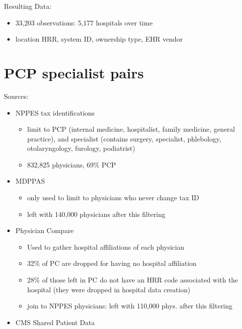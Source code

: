 \documentclass[12pt]{article}
\begin{document}
\noindent Resulting Data:
\begin{itemize}
    \item 33,203 observations: 5,177 hospitals over time
    \item location HRR, system ID, ownership type, EHR vendor
\end{itemize}

\section{PCP specialist pairs}
Sources:
\begin{itemize}
    \item NPPES tax identifications
    \begin{itemize}
        \item limit to PCP (internal medicine, hospitalist, family medicine, general practice), and specialist (contains surgery, specialist, phlebology, otolaryngology, furology, podiatrist)
        \item 832,825 physicians, 69\% PCP
    \end{itemize}
    \item MDPPAS
    \begin{itemize}
        \item only used to limit to physicians who never change tax ID
        \item left with 140,000 physicians after this filtering
    \end{itemize}
    \item Physician Compare
    \begin{itemize}
        \item Used to gather hospital affiliations of each physician
        \item 32\% of PC are dropped for having no hospital affiliation
        \item 28\% of those left in PC  do not have an HRR code associated with the hospital (they were dropped in hospital data creation)
        \item join to NPPES physicians: left with 110,000 phys. after this filtering
    \end{itemize}
    \item CMS Shared Patient Data
\end{itemize}
\end{document}
